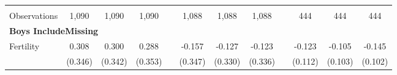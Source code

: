 \begin{landscape}
\begin{table}[htpb!]
\begin{center}
\begin{tabular}{lcccp{2mm}cccp{2mm}ccc}
\begin{footnotesize}\end{footnotesize}&\begin{footnotesize}\end{footnotesize}&\begin{footnotesize}\end{footnotesize}&\begin{footnotesize}\end{footnotesize}&\begin{footnotesize}\end{footnotesize}&\begin{footnotesize}\end{footnotesize}&\begin{footnotesize}\end{footnotesize}&\begin{footnotesize}\end{footnotesize}&\begin{footnotesize}\end{footnotesize}&\begin{footnotesize}\end{footnotesize}&\begin{footnotesize}\end{footnotesize}&\begin{footnotesize}\end{footnotesize}\\Observations&1,090&1,090&1,090&&1,088&1,088&1,088&&444&444&444\\
\multicolumn{12}{l}{\textbf{Boys IncludeMissing}}\\ 
Fertility&0.308&0.300&0.288&&-0.157&-0.127&-0.123&&-0.123&-0.105&-0.145\\
&(0.346)&(0.342)&(0.353)&&(0.347)&(0.330)&(0.336)&&(0.112)&(0.103)&(0.102)\\

\end{tabular}
\end{center}
\end{table}
\end{landscape}
